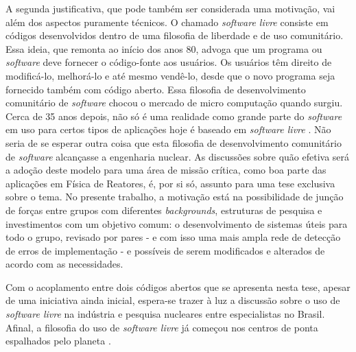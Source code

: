 A segunda justificativa, que pode também ser considerada uma motivação, vai além dos aspectos puramente técnicos.
O chamado \textit{software livre} consiste em códigos desenvolvidos dentro de uma filosofia de liberdade e de uso
comunitário. Essa ideia, que remonta ao início dos anos 80, advoga que um programa ou \textit{software} deve fornecer
o código-fonte aos usuários. Os usuários têm direito de modificá-lo, melhorá-lo e até mesmo vendê-lo, desde que o novo
programa seja fornecido também com código aberto. Essa filosofia de desenvolvimento comunitário de \textit{software}
chocou o mercado de micro computação quando surgiu. Cerca de 35 anos depois, não só é uma realidade como
grande parte do \textit{software} em uso para certos tipos de aplicações hoje é baseado em \textit{software livre}
\cite{Androutsellis2010}. Não seria de se esperar outra coisa que esta filosofia de desenvolvimento comunitário de
\textit{software} alcançasse a engenharia nuclear. As discussões sobre quão efetiva será a adoção deste modelo
para uma área de missão crítica, como boa parte das aplicações em Física de Reatores, é, por si só, assunto para uma
tese exclusiva sobre o tema. No presente trabalho, a motivação está na possibilidade de junção de forças entre grupos com
diferentes \textit{backgrounds}, estruturas de pesquisa e investimentos com um objetivo comum: o desenvolvimento
de sistemas úteis para todo o grupo, revisado por pares - e com isso uma mais ampla rede de detecção de erros
de implementação - e possíveis de serem modificados e alterados de acordo com as necessidades.

Com o acoplamento entre dois códigos abertos que se apresenta nesta tese, apesar
de uma iniciativa ainda inicial, espera-se trazer à luz a discussão sobre o uso de \textit{software livre} na
indústria e pesquisa nucleares entre especialistas no Brasil. Afinal, a filosofia do uso de \textit{software livre}
já começou nos centros de ponta espalhados pelo planeta \cite{Romano2013, Boyd2014, Huff2016}.





